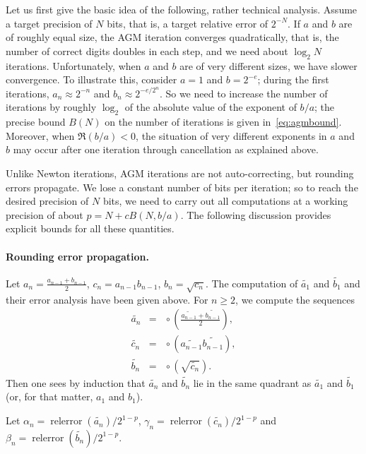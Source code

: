 \documentclass [11pt]{article}
\newcommand {\corr}[1]{{#1}}
\newcommand {\appro}[1]{\widetilde {#1}}
\newcommand{\relerror}{\operatorname {relerror}}
\newcommand {\round}{\operatorname {\circ}}
\renewcommand {\geq}{\geqslant}
\begin{document}
Let us first give the basic idea of the following, rather technical analysis.
Assume a target precision of $N$ bits, that is, a target
relative error of $2^{-N}$. If $a$ and $b$ are of roughly equal size, the AGM
iteration converges quadratically, that is, the number of correct digits
doubles in each step, and we need about $\log_2 N$ iterations. Unfortunately,
when $a$ and $b$ are of very different sizes, we have slower convergence.
To illustrate this, consider $a = 1$ and $b = 2^{-e}$; during the first
iterations, $a_n \approx 2^{-n}$ and $b_n \approx 2^{-e/2^n}$. So we need
to increase the number of iterations by roughly $\log_2$ of the absolute
value of the exponent of $b/a$; the precise bound $B (N)$ on the number
of iterations is given in~\eqref {eq:agmbound}.
Moreover, when $\Re (b/a) < 0$, the situation of
very different exponents in $a$ and $b$ may occur after one iteration through
cancellation as explained above.

Unlike Newton iterations, AGM iterations are not auto-correcting, but
rounding errors propagate. We lose a constant number of bits per iteration;
so to reach the desired precision of $N$ bits, we need to carry out all
computations at a working precision of about $p = N + c B (N, b/a)$.
The following discussion provides explicit bounds for all these quantities.


\paragraph {Rounding error propagation.}

Let
$\corr {a_n} = \frac {\corr {a_{n-1}} + \corr {b_{n-1}}}{2}$,
$\corr {c_n} = \corr {a_{n-1}} \corr {b_{n-1}}$,
$\corr {b_n} = \sqrt {\corr {c_n}}$.
The computation of $\appro {a_1}$ and $\appro {b_1}$ and their error
analysis have been given above.
For $n \geq 2$, we compute the sequences
\begin {eqnarray*}
\appro {a_n}
& = & \round \left( \frac {\appro {a_{n-1}} + \appro {b_{n-1}}}{2} \right), \\
\appro {c_n}
& = & \round \left( \appro {a_{n-1}} \appro {b_{n-1}} \right), \\
\appro {b_n}
& = & \round \left( \sqrt {\appro {c_n}} \right).
\end {eqnarray*}
Then one sees by induction that
$\appro {a_n}$ and $\appro {b_n}$ lie in the same quadrant as
$\appro {a_1}$ and $\appro {b_1}$
(or, for that matter, $\corr {a_1}$ and $\corr {b_1}$).

Let $\alpha_n = \relerror (\appro {a_n}) / 2^{1-p}$,
$\gamma_n = \relerror (\appro {c_n}) / 2^{1-p}$ and
$\beta_n = \relerror (\appro {b_n}) / 2^{1-p}$.
\end{document}
